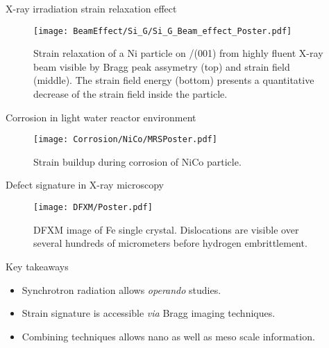 
\separatorcolumn

\begin{column}{\colwidth}

    \begin{block}{X-ray irradiation strain relaxation effect}
        \begin{figure}
            \centering
            \texttt{[image: BeamEffect/Si\_G/Si\_G\_Beam\_effect\_Poster.pdf]}
            \caption{Strain relaxation of a Ni particle on /(001) from highly fluent X-ray beam visible by Bragg peak assymetry (top) and strain field (middle).
            The strain field energy (bottom) presents a quantitative decrease of the strain field inside the particle.
            }
        \end{figure}
    \end{block}

    \begin{block}{Corrosion in light water reactor environment}
        \begin{figure}
            \centering
            \texttt{[image: Corrosion/NiCo/MRSPoster.pdf]}
            \caption{Strain buildup during corrosion of NiCo particle.}
        \end{figure}
    \end{block}

    \begin{block}{Defect signature in X-ray microscopy}

        \begin{figure}
            \centering
            \texttt{[image: DFXM/Poster.pdf]}
            \caption{DFXM image of Fe single crystal. Dislocations are visible over several hundreds of micrometers before hydrogen embrittlement.}
        \end{figure}
    \end{block}


    \begin{alertblock}{Key takeaways}
        \begin{itemize}
            \setlength\itemsep{1em}
            \item Synchrotron radiation allows \textit{operando} studies.
            \item Strain signature is accessible \textit{via} Bragg imaging techniques.
            \item Combining techniques allows nano as well as meso scale information.
        \end{itemize}


\end{alertblock}
\end{column}
